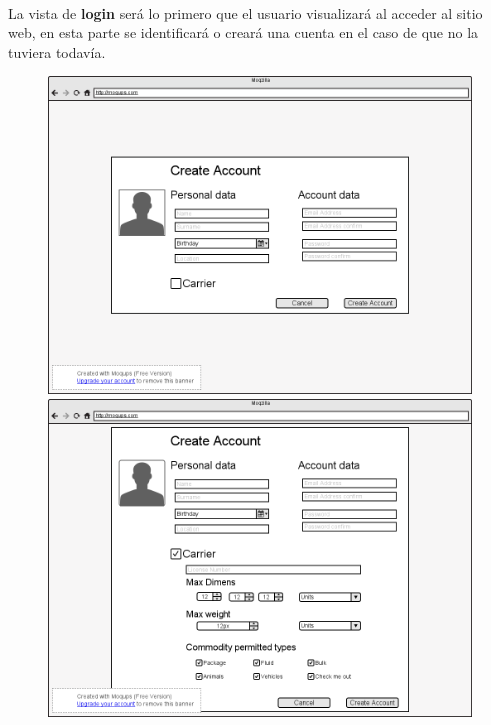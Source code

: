 \documentclass[10pt, a4paper,spanish]{article}
\begin{document}
			\paragraph{}
			La vista de \textbf{login} será lo primero que el usuario visualizará al acceder al sitio web, en esta parte se identificará o creará una cuenta en el caso de que no la tuviera todavía.


			\begin{figure}[H]
				\centering
				\begin{minipage}[b]{0.49\textwidth}
					\includegraphics[width=\textwidth]{res/CrearCuenta.png}
				\end{minipage}
				\begin{minipage}[b]{0.49\textwidth}
					\includegraphics[width=\textwidth]{res/CrearCuentaTransportista.png}
				\end{minipage}
			\end{figure}
\end{document}
